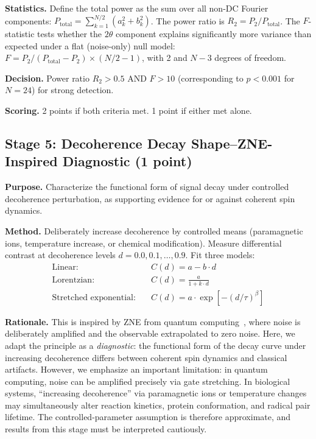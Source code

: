 \documentclass[preprint,amsmath,amssymb]{revtex4-2}
\begin{document}
\textbf{Statistics.} Define the total power as the sum over all non-DC Fourier components: $P_\text{total} = \sum_{k=1}^{N/2} (a_k^2 + b_k^2)$. The power ratio is $R_2 = P_2 / P_\text{total}$. The $F$-statistic tests whether the $2\theta$ component explains significantly more variance than expected under a flat (noise-only) null model: $F = P_2 / (P_\text{total} - P_2) \times (N/2 - 1)$, with 2 and $N - 3$ degrees of freedom.

\textbf{Decision.} Power ratio $R_2 > 0.5$ AND $F > 10$ (corresponding to $p < 0.001$ for $N = 24$) for strong detection.

\textbf{Scoring.} 2 points if both criteria met. 1 point if either met alone.

\subsection{Stage 5: Decoherence Decay Shape--ZNE-Inspired Diagnostic (1 point)}

\textbf{Purpose.} Characterize the functional form of signal decay under controlled decoherence perturbation, as supporting evidence for or against coherent spin dynamics.

\textbf{Method.} Deliberately increase decoherence by controlled means (paramagnetic ions, temperature increase, or chemical modification). Measure differential contrast at decoherence levels $d = 0.0, 0.1, \ldots, 0.9$. Fit three models:
\begin{align}
\text{Linear:} \quad & C(d) = a - b \cdot d \\
\text{Lorentzian:} \quad & C(d) = \frac{a}{1 + k \cdot d} \\
\text{Stretched exponential:} \quad & C(d) = a \cdot \exp\left[-(d/\tau)^\beta\right]
\end{align}

\textbf{Rationale.} This is inspired by ZNE from quantum computing~\cite{temme2017,giurgica2020}, where noise is deliberately amplified and the observable extrapolated to zero noise. Here, we adapt the principle as a \emph{diagnostic}: the functional form of the decay curve under increasing decoherence differs between coherent spin dynamics and classical artifacts. However, we emphasize an important limitation: in quantum computing, noise can be amplified precisely via gate stretching. In biological systems, ``increasing decoherence'' via paramagnetic ions or temperature changes may simultaneously alter reaction kinetics, protein conformation, and radical pair lifetime. The controlled-parameter assumption is therefore approximate, and results from this stage must be interpreted cautiously.
\end{document}

